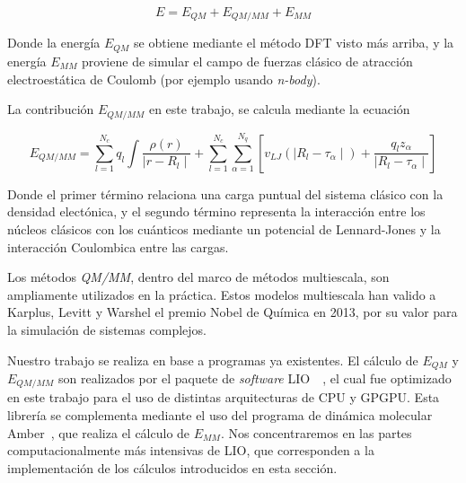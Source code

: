 \begin{equation}
    E = E_{QM} + E_{QM/MM} + E_{MM}
\end{equation}

Donde la energ\'ia $E_{QM}$ se obtiene mediante el m\'etodo DFT visto m\'as arriba, y la energ\'ia
$E_{MM}$ proviene de simular el campo de fuerzas cl\'asico de atracci\'on electroest\'atica de
Coulomb (por ejemplo usando \textit{n-body}).

La contribuci\'on $E_{QM/MM}$ en este trabajo, se calcula mediante la ecuaci\'on

\begin{equation}
    E_{QM/MM} = \sum_{l = 1}^{N_c} q_l \int \frac{\rho(r)}{\mid r - R_l \mid} + \sum_{l = 1}^{N_c}\sum_{\alpha = 1}^{N_q} [ v_{LJ} ( \mid R_l - \tau_\alpha \mid ) + \frac{q_l z_\alpha}{\mid R_l - \tau_\alpha \mid} ]
\end{equation}

Donde el primer t\'ermino relaciona una carga puntual del sistema cl\'asico con la densidad
elect\'onica, y el segundo t\'ermino representa la interacci\'on entre los n\'ucleos cl\'asicos
con los cu\'anticos mediante un potencial de Lennard-Jones y la interacci\'on Coulombica entre
las cargas.

Los m\'etodos \textit{QM/MM}, dentro del marco de m\'etodos multiescala, son ampliamente utilizados en
la pr\'actica. Estos modelos multiescala han valido a Karplus, Levitt y
Warshel el premio Nobel de Qu\'imica en 2013, por su valor para la simulaci\'on de sistemas complejos.

Nuestro trabajo se realiza en base a programas ya existentes. El c\'alculo de $E_{QM}$ y $E_{QM/MM}$ son realizados por el paquete de
\textit{software} LIO~\cite{LIO}~\cite{TesisNitsche}, el cual fue optimizado en este trabajo para el uso de
distintas arquitecturas de CPU y GPGPU. Esta librer\'ia
se complementa mediante el uso del programa de din\'amica molecular Amber~\cite{Amber}, que realiza el c\'alculo
de $E_{MM}$. Nos concentraremos en las partes computacionalmente m\'as intensivas de LIO, que corresponden a la
implementaci\'on de los c\'alculos introducidos en esta secci\'on.
